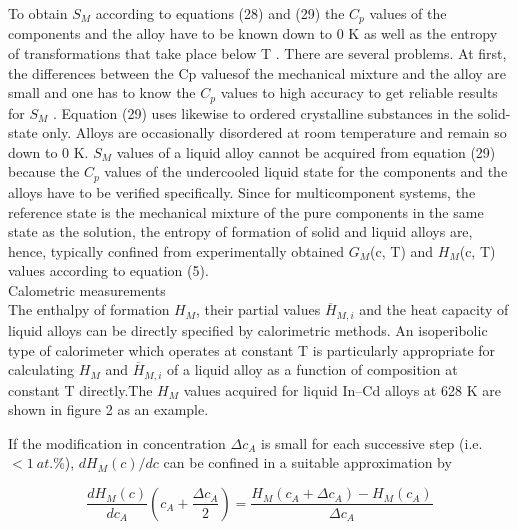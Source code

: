 \documentclass[12pt]{article}
\newcommand*{\1}{\hspace{1pt}}
\begin{document}
To obtain $S _M$ according to equations (28) and (29) the $C _p$ values of the components and the
alloy have to be known down to 0 K as well as the entropy of transformations that take
place below T . There are several problems. At first, the differences between the Cp valuesof the mechanical mixture and the alloy are small and one has to know the $ C _p$ values to 
high accuracy to get reliable results for $S _M$ . Equation (29) uses likewise to ordered
crystalline substances in the solid-state only. Alloys are occasionally disordered at room
temperature and remain so down to 0 K. $S _M$ values of a liquid alloy cannot be acquired from
equation (29) because the $C _p $  values of the undercooled liquid state for the components and
the alloys have to be verified specifically. Since for multicomponent systems, the reference 
state is the mechanical mixture of the pure components in the same state as the solution,
the entropy of formation of solid and liquid alloys are, hence, typically confined from
experimentally obtained $ G _M$(c, T) and $ H _M $(c, T) values according to equation (5).\\


Calometric measurements\\


The enthalpy of formation $ H _M $, their partial values  $ \overline{H} _{M,i} $
and the heat capacity of liquid alloys can be directly specified by calorimetric methods.
An isoperibolic type of calorimeter which operates at constant T is particularly appropriate for
calculating $H _M $ and $ \overline{H} _{M,i} $ of a liquid alloy as a function of composition 
at constant T directly.The $ H _M $ values acquired for liquid In–Cd alloys at 628 K are
shown in figure 2 as an example.

\begin{adjustbox}{center,caption={Enthalpy of mixing of liquid Cd–In alloys
    },label={somelabel},nofloat=figure,vspace=\bigskipamount}
\end{adjustbox}

If the modification in concentration $ \Delta c _A $ is small for each successive step (i.e. $ <  1 \ at.\% $),
$ dH _M (c)/dc $ can be confined in a suitable approximation by


    \begin{equation}
       \frac{ dH _M (c)}{dc _A} \left(c _A + \frac{\Delta c _A}{2} \right) = \frac{H _M 
       (c _A + \Delta c _A )-H _M (c _A)}{\Delta c _A } 
    \end{equation} 
\end{document}
